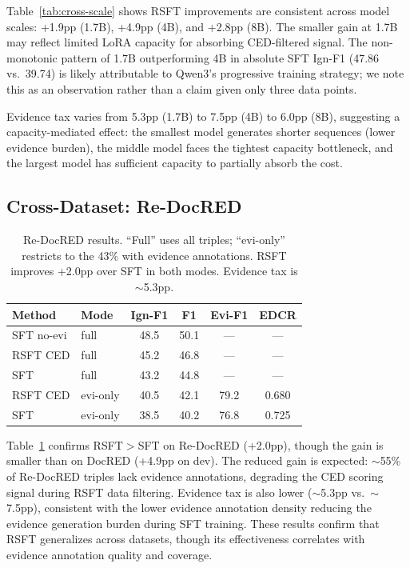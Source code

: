 \documentclass[11pt,a4paper]{article}
\begin{document}
Table~\ref{tab:cross-scale} shows RSFT improvements are consistent across model scales: +1.9pp (1.7B), +4.9pp (4B), and +2.8pp (8B). The smaller gain at 1.7B may reflect limited LoRA capacity for absorbing CED-filtered signal. The non-monotonic pattern of 1.7B outperforming 4B in absolute SFT Ign-F1 (47.86 vs.\ 39.74) is likely attributable to Qwen3's progressive training strategy; we note this as an observation rather than a claim given only three data points.

Evidence tax varies from 5.3pp (1.7B) to 7.5pp (4B) to 6.0pp (8B), suggesting a capacity-mediated effect: the smallest model generates shorter sequences (lower evidence burden), the middle model faces the tightest capacity bottleneck, and the largest model has sufficient capacity to partially absorb the cost.

\subsection{Cross-Dataset: Re-DocRED}
\label{sec:redocred}

\begin{table}[t]
\centering
\small
\begin{tabular}{llcccc}
\toprule
\textbf{Method} & \textbf{Mode} & \textbf{Ign-F1} & \textbf{F1} & \textbf{Evi-F1} & \textbf{EDCR} \\
\midrule
SFT no-evi & full & 48.5 & 50.1 & --- & --- \\
RSFT CED & full & 45.2 & 46.8 & --- & --- \\
SFT & full & 43.2 & 44.8 & --- & --- \\
\midrule
RSFT CED & evi-only & 40.5 & 42.1 & 79.2 & 0.680 \\
SFT & evi-only & 38.5 & 40.2 & 76.8 & 0.725 \\
\bottomrule
\end{tabular}
\caption{Re-DocRED results. ``Full'' uses all triples; ``evi-only'' restricts to the 43\% with evidence annotations. RSFT improves +2.0pp over SFT in both modes. Evidence tax is $\sim$5.3pp.}
\label{tab:redocred}
\end{table}

Table~\ref{tab:redocred} confirms RSFT$>$SFT on Re-DocRED (+2.0pp), though the gain is smaller than on DocRED (+4.9pp on dev). The reduced gain is expected: $\sim$55\% of Re-DocRED triples lack evidence annotations, degrading the CED scoring signal during RSFT data filtering. Evidence tax is also lower ($\sim$5.3pp vs.\ $\sim$7.5pp), consistent with the lower evidence annotation density reducing the evidence generation burden during SFT training. These results confirm that RSFT generalizes across datasets, though its effectiveness correlates with evidence annotation quality and coverage.
\end{document}
